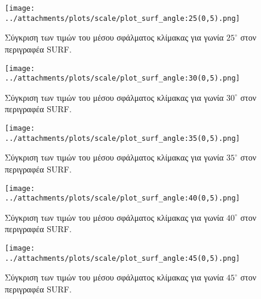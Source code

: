 \begin{figure}[ht!]
\begin{minipage}[b]{1.0\linewidth}
\centering
\texttt{[image: ../attachments/plots/scale/plot\_surf\_angle:25(0,5).png]}
\caption{Σύγκριση των τιμών του μέσου σφάλματος κλίμακας για γωνία $25^{\circ}$ στον περιγραφέα SURF.}
\label{fig:corner_surf_25}
\end{minipage}
\end{figure}
\begin{figure}[ht!]
\begin{minipage}[b]{1.0\linewidth}
\centering
\texttt{[image: ../attachments/plots/scale/plot\_surf\_angle:30(0,5).png]}
\caption{Σύγκριση των τιμών του μέσου σφάλματος κλίμακας για γωνία $30^{\circ}$ στον περιγραφέα SURF.}
\label{fig:corner_surf_30} 
\end{minipage}
\end{figure} 

 \newpage

\begin{figure}[ht!]
\begin{minipage}[b]{1.0\linewidth}
\centering
\texttt{[image: ../attachments/plots/scale/plot\_surf\_angle:35(0,5).png]}
\caption{Σύγκριση των τιμών του μέσου σφάλματος κλίμακας για γωνία $35^{\circ}$ στον περιγραφέα SURF.}
\label{fig:corner_surf_35}
\end{minipage}
\end{figure}
\begin{figure}[ht!]
\begin{minipage}[b]{1.0\linewidth}
\centering
\texttt{[image: ../attachments/plots/scale/plot\_surf\_angle:40(0,5).png]}
\caption{Σύγκριση των τιμών του μέσου σφάλματος κλίμακας για γωνία $40^{\circ}$ στον περιγραφέα SURF.}
\label{fig:corner_surf_40}
\end{minipage}
\end{figure}  
 
\newpage

\begin{figure}[ht!]
\begin{minipage}[b]{1.0\linewidth}
\centering
\texttt{[image: ../attachments/plots/scale/plot\_surf\_angle:45(0,5).png]}
\caption{Σύγκριση των τιμών του μέσου σφάλματος κλίμακας για γωνία $45^{\circ}$ στον περιγραφέα SURF.}
\label{fig:corner_surf_45}
\end{minipage}
\end{figure} 

\newpage

